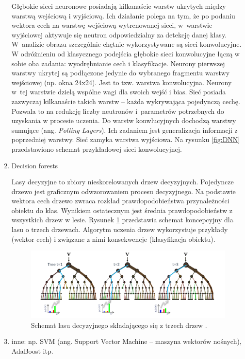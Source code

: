 \begin{enumerate}
Głębokie sieci neuronowe posiadają kilkanaście warstw ukrytych między warstwą wejściową i wyjściową. 
Ich działanie polega na tym, że po podaniu wektora cech na warstwę wejściową wytrenowanej sieci, w~warstwie wyjściowej aktywuje się neutron odpowiedzialny za detekcję danej klasy. 
W~analizie obrazu szczególnie chętnie wykorzystywane są sieci konwolucyjne. W odróżnieniu od klasycznego podejścia głębokie sieci konwolucyjne łączą w sobie oba zadania: wyodrębnianie cech i klasyfikacje.
Neurony pierwszej warstwy ukrytej są podłączone jedynie do wybranego fragmentu warstwy wejściowej (np. okna 24x24). %
Jest to tzw. warstwa konwolucyjna. 
Neurony w~tej warstwie dzielą wspólne wagi dla swoich wejść i bias. 
Sieć posiada zazwyczaj kilkanaście takich warstw -- każda wykrywająca pojedynczą cechę. 
Pozwala to na redukcję liczby neutronów i~parametrów potrzebnych do uzyskania w procesie uczenia. 
Do warstw konwlucyjnych dochodzą warstwy sumujące (ang. \textit{Polling Layers}). 
Ich zadaniem jest generalizacja informacji z poprzedniej warstwy. 
Sieć zamyka warstwa wyjściowa. Na rysunku \ref{fig:DNN} przedstawiono schemat przykładowej sieci konwolucyjnej.

\item Decision forests

Lasy decyzyjne to zbiory nieskorelowanych drzew decyzyjnych. 
Pojedyncze drzewo jest graficznym odwzorowaniem procesu decyzyjnego. Na podstawie wektora cech drzewo zwraca rozkład prawdopodobieństwa przynależności obiektu do klas. Wynikiem ostatecznym jest średnia prawdopodobieństw z wszystkich drzew w lesie. Rysunek \ref{fig:forest} przedstawia schemat koncepcyjny dla lasu o trzech drzewach.
Algorytm uczenia drzew wykorzystuje przykłady (wektor cech) i związane z nimi konsekwencje (klasyfikacja obiektu).

\begin{figure}
\centering
\includegraphics[width=0.9\linewidth]{images/forest}
\caption[Las decyzyjny.]{Schemat lasu decyzyjnego składającego się z trzech drzew \cite{criminisi2011decision}.}
\label{fig:forest}
\end{figure}

\item inne: np. SVM (ang. Support Vector Machine -- maszyna wektorów nośnych), AdaBoost itp.


\end{enumerate}


